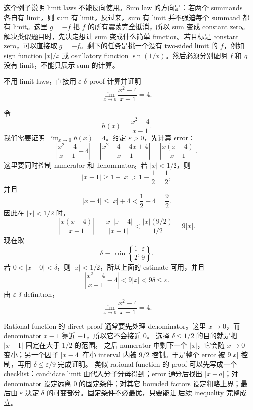 \begin{explanation}
这个例子说明 limit laws 不能反向使用。Sum law 的方向是：若两个 summands
各自有 limit，则 sum 有 limit。反过来，sum 有 limit 并不强迫每个 summand
都有 limit。这里 \(g=-f\) 把 \(f\) 的所有震荡完全抵消，所以 sum 变成
constant zero。
解决类似题目时，先决定想让 sum 变成什么简单 function。若目标是 constant
zero，可以直接取 \(g=-f\)。剩下的任务是挑一个没有 two-sided limit 的
\(f\)，例如 sign function \(|x|/x\) 或 oscillatory function
\(\sin(1/x)\)。然后必须分别证明 \(f\) 和 \(g\) 没有 limit，不能只展示
sum 的计算。
\end{explanation}

\begin{exerciseblock}
不用 limit laws，直接用 \(\varepsilon\)-\(\delta\) proof 计算并证明
\[
  \lim_{x\to0}\frac{x^2-4}{x-1}=4.
\]
\end{exerciseblock}

\begin{solution}
令
\[
  h(x)=\frac{x^2-4}{x-1}.
\]
我们需要证明 \(\lim_{x\to0}h(x)=4\)。给定 \(\varepsilon>0\)，先计算
error：
\[
  \left|\frac{x^2-4}{x-1}-4\right|
  =
  \left|\frac{x^2-4-4x+4}{x-1}\right|
  =
  \left|\frac{x(x-4)}{x-1}\right|.
\]
这里要同时控制 numerator 和 denominator。若 \(|x|<1/2\)，则
\[
  |x-1|\geq 1-|x|>1-\frac12=\frac12,
\]
并且
\[
  |x-4|\leq |x|+4<\frac12+4=\frac92.
\]
因此在 \(|x|<1/2\) 时，
\[
  \left|\frac{x(x-4)}{x-1}\right|
  =
  \frac{|x|\,|x-4|}{|x-1|}
  <
  \frac{|x|(9/2)}{1/2}
  =
  9|x|.
\]
现在取
\[
  \delta=\min\left\{\frac12,\frac{\varepsilon}{9}\right\}.
\]
若 \(0<|x-0|<\delta\)，则 \(|x|<1/2\)，所以上面的 estimate 可用，并且
\[
  \left|\frac{x^2-4}{x-1}-4\right|
  <
  9|x|
  <
  9\delta
  \leq
  \varepsilon.
\]
由 \(\varepsilon\)-\(\delta\) definition，
\[
  \lim_{x\to0}\frac{x^2-4}{x-1}=4.
\]
\end{solution}

\begin{explanation}
Rational function 的 direct proof 通常要先处理 denominator。这里
\(x\to0\)，而 denominator \(x-1\) 靠近 \(-1\)，所以它不会接近 \(0\)。
选择 \(\delta\leq1/2\) 的目的就是把 \(|x-1|\) 固定在大于 \(1/2\) 的范围。
之后 numerator 中剩下一个 \(|x|\)，它会随 \(x\to0\) 变小；另一个因子
\(|x-4|\) 在小 interval 内被 \(9/2\) 控制。于是整个 error 被 \(9|x|\)
控制，再用 \(\delta\leq\varepsilon/9\) 完成证明。
类似 rational function 的 proof 可以先写成一个 checklist：candidate
limit 由代入分子分母得到；error 通分后找出 \(|x-a|\)；对 denominator
设定远离 \(0\) 的固定条件；对其它 bounded factors 设定粗略上界；最后由
\(\varepsilon\) 决定 \(\delta\) 的可变部分。固定条件不必最优，只要能让
后续 inequality 完整成立。
\end{explanation}

